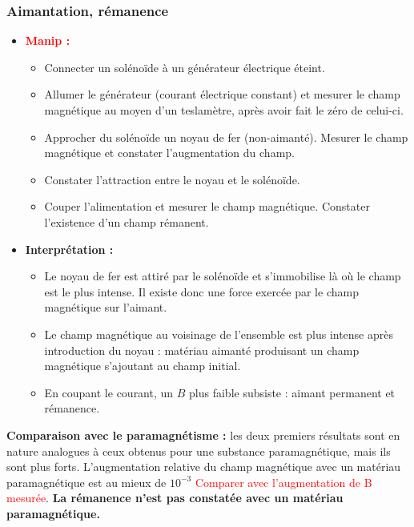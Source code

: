 \documentclass[11pt,a4paper]{report}
\begin{document}
\subsubsection{Aimantation, rémanence}
\begin{itemize}
	\item \textcolor{red}{\textbf{Manip :}}
	\begin{itemize}
		\item Connecter un solénoïde à un générateur électrique éteint.
		\item Allumer le générateur (courant électrique constant) et mesurer le champ magnétique au 				moyen d'un teslamètre, après avoir fait le zéro de celui-ci.
		\item Approcher du solénoïde un noyau de fer (non-aimanté). Mesurer le champ magnétique et 					constater l'augmentation du champ.
		\item Constater l'attraction entre le noyau et le solénoïde.
		\item Couper l'alimentation et mesurer le champ magnétique. Constater l'existence d'un champ 				rémanent.\\
	\end{itemize}
	
	\item \textbf{Interprétation : }
	\begin{itemize}
		\item Le noyau de fer est attiré par le solénoïde et s'immobilise là où le champ est 
			le plus intense. Il existe donc une force exercée par le champ magnétique sur l'aimant.
		\item Le champ magnétique au voisinage de l'ensemble est plus intense après introduction du 				noyau : matériau aimanté produisant un champ magnétique s'ajoutant au champ initial.
		\item En coupant le courant, un $B$ plus faible subsiste : aimant permanent et rémanence.\\
	\end{itemize}
\end{itemize}

\textbf{Comparaison avec le paramagnétisme :} les deux premiers résultats sont en nature analogues à ceux obtenus pour une substance paramagnétique, mais ils sont plus forts. L'augmentation relative du champ magnétique avec un matériau paramagnétique est au mieux de $10^{-3}$ \textcolor{red}{Comparer avec l'augmentation de B mesurée}. \textbf{La rémanence n'est pas constatée avec un matériau paramagnétique.}
\end{document}
